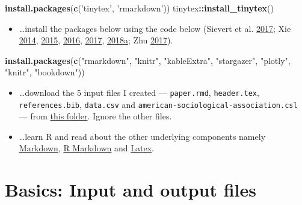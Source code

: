 \documentclass[12pt,]{article}
\newenvironment{Shaded}{\begin{snugshade}}{\end{snugshade}}
\newcommand{\KeywordTok}[1]{\textcolor[rgb]{0.13,0.29,0.53}{\textbf{#1}}}
\newcommand{\StringTok}[1]{\textcolor[rgb]{0.31,0.60,0.02}{#1}}
\newcommand{\OperatorTok}[1]{\textcolor[rgb]{0.81,0.36,0.00}{\textbf{#1}}}
\newcommand{\NormalTok}[1]{#1}
\providecommand{\tightlist}{%
  \setlength{\itemsep}{0pt}\setlength{\parskip}{0pt}}
\theoremstyle{definition}
\theoremstyle{definition}
\theoremstyle{definition}
\theoremstyle{remark}
\begin{document}
\begin{Shaded}
\begin{Highlighting}[]
\KeywordTok{install.packages}\NormalTok{(}\KeywordTok{c}\NormalTok{(}\StringTok{'tinytex'}\NormalTok{, }\StringTok{'rmarkdown'}\NormalTok{))}
\NormalTok{tinytex}\OperatorTok{::}\KeywordTok{install_tinytex}\NormalTok{()}
\end{Highlighting}
\end{Shaded}

\begin{itemize}
\tightlist
\item
  \ldots{}install the packages below using the code below (Sievert et
  al. \protect\hyperlink{ref-plotly}{2017}; Xie
  \protect\hyperlink{ref-knitr3}{2014},
  \protect\hyperlink{ref-knitr2}{2015},
  \protect\hyperlink{ref-bookdown2}{2016},
  \protect\hyperlink{ref-bookdown1}{2017},
  \protect\hyperlink{ref-knitr1}{2018}\protect\hyperlink{ref-knitr1}{a};
  Zhu \protect\hyperlink{ref-kableextra}{2017}).
\end{itemize}

\begin{Shaded}
\begin{Highlighting}[]
\KeywordTok{install.packages}\NormalTok{(}\KeywordTok{c}\NormalTok{(}\StringTok{"rmarkdown"}\NormalTok{, }\StringTok{"knitr"}\NormalTok{, }\StringTok{"kableExtra"}\NormalTok{,}
                   \StringTok{"stargazer"}\NormalTok{, }\StringTok{"plotly"}\NormalTok{, }\StringTok{"knitr"}\NormalTok{,}
                   \StringTok{"bookdown"}\NormalTok{))}
\end{Highlighting}
\end{Shaded}

\begin{itemize}
\item
  \ldots{}download the 5 input files I created --- \texttt{paper.rmd},
  \texttt{header.tex}, \texttt{references.bib}, \texttt{data.csv} and
  \texttt{american-sociological-association.csl} --- from
  \href{https://drive.google.com/drive/folders/1zJP3cNPrHN-gj0rcmbHQgg-XA0hqDXdd?usp=sharing}{this
  folder}. Ignore the other files.
\item
  \ldots{}learn R and read about the other underlying components namely
  \href{https://en.wikipedia.org/wiki/Markdown}{Markdown},
  \href{https://rmarkdown.rstudio.com/lesson-1.html}{R Markdown} and
  \href{https://en.wikipedia.org/wiki/LaTeX}{Latex}.
\end{itemize}

\section{Basics: Input and output
files}\label{basics-input-and-output-files}
\end{document}
